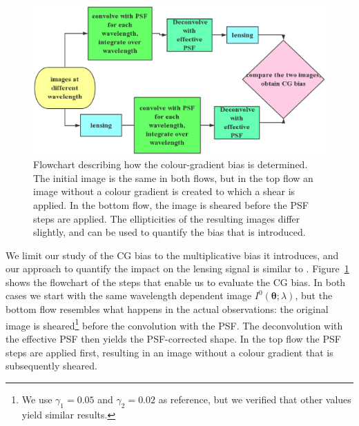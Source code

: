 \documentclass[useAMS,usenatbib]{mnras}
\begin{document}
%
\begin{figure}
\includegraphics[width=12.5cm]{colourg.eps}
\caption{Flowchart describing how the colour-gradient bias is determined. The initial image
is the same in both flows, but in the top flow an image without a colour gradient is created
to which a shear is applied. In the bottom flow, the image is sheared before the PSF steps
are applied. The ellipticities of the resulting images differ slightly, and can be used to quantify
the bias that is introduced.}
\label{fig:flowchart}
\end{figure}
%

We limit our study of the CG bias to the multiplicative bias it introduces, and our approach to quantify 
the impact on the lensing signal is similar to . Figure~\ref{fig:flowchart} shows the flowchart of the steps that enable us to evaluate the CG bias.  In both cases we start with the same wavelength dependent image $I^0({\bm \theta};\lambda)$, but the bottom flow resembles what happens in the actual observations: the original image is sheared\footnote{We use 
$\gamma_1=0.05$  and $\gamma_2=0.02$ as reference, but we verified that other values yield similar results.} before the convolution with the PSF. The deconvolution with the effective PSF then yields the PSF-corrected shape. In the top flow the PSF steps are applied first, resulting in an image without a colour gradient that is subsequently sheared. 
\end{document}
